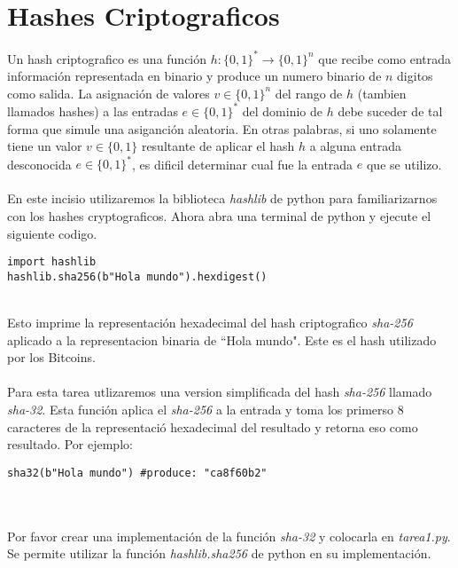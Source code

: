 \documentclass{article}
\begin{document}
\section{Hashes Criptograficos}

Un hash criptografico es una funci\'{o}n $h: \{0,1\}^* \rightarrow \{0,1\}^n$ que
recibe como entrada informaci\'{o}n representada en binario y produce un numero
binario de $n$ digitos como salida. La asignaci\'{o}n de valores $v \in \{0,1\}^n$
del rango de $h$ (tambien llamados hashes) a las entradas $e \in \{0,1\}^*$ del dominio de $h$
debe suceder de tal forma que simule una asiganci\'{o}n aleatoria. En otras palabras,
si uno solamente tiene un valor $v \in \{0,1\}$ resultante de aplicar el hash $h$ a alguna 
entrada desconocida $e \in \{0,1\}^*$, es dificil determinar cual fue la entrada $e$ que se utilizo.
\\\\
En este incisio utilizaremos la biblioteca \emph{hashlib} de python para familiarizarnos
con los hashes cryptograficos. Ahora abra una terminal de python y ejecute el siguiente codigo.

\begin{lstlisting}
import hashlib
hashlib.sha256(b"Hola mundo").hexdigest()
\end{lstlisting}
\\
Esto imprime la representaci\'{o}n hexadecimal del hash criptografico \emph{sha-256} 
aplicado a la representacion binaria de ``Hola mundo". Este es el hash utilizado por
los Bitcoins.
\\\\
Para esta tarea utlizaremos una version simplificada del hash \emph{sha-256} llamado \emph{sha-32}. Esta
funci\'{o}n aplica el \emph{sha-256} a la entrada y toma los primerso 8 caracteres de la representaci\'{o}
hexadecimal del resultado y retorna eso como resultado. Por ejemplo:
\begin{lstlisting}
sha32(b"Hola mundo") #produce: "ca8f60b2"
\end{lstlisting} 
\\\\
Por favor crear una implementaci\'{o}n de la funci\'{o}n \emph{sha-32} y colocarla en
\emph{tarea1.py}. Se permite utilizar la funci\'{o}n \emph{hashlib.sha256} de python en su
implementaci\'{o}n.
\end{document}
